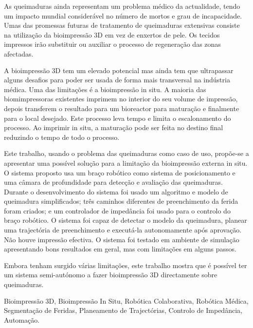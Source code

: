 
As queimaduras ainda representam um problema médico da actualidade, tendo um impacto mundial considerável no número de mortos e grau de incapacidade. Umas das promessas futuras de tratamento de queimaduras extensivas consiste na utilização da bioimpressão 3D em vez de enxertos de pele. Os tecidos impressos irão substituir ou auxiliar o processo de regeneração das zonas afectadas.

A bioimpressão 3D tem um elevado potencial mas ainda tem que ultrapassar alguns desafios para poder ser usada de forma mais transversal na indústria médica. Uma das limitações é a bioimpressão in situ. A maioria das biomimpressoras existentes imprimem no interior do seu volume de impressão, depois transferem o resultado para um bioreactor para maturação e finalmente para o local desejado. Este processo leva tempo e limita o escalonamento do processo. Ao imprimir in situ, a maturação pode ser feita no destino final reduzindo o tempo de todo o processo.

Este trabalho, usando o problema das queimaduras como caso de uso, propõe-se a apresentar uma possível solução para a limitação da bioimpressão externa in situ. O sistema proposto usa um braço robótico como sistema de posicionamento e uma câmara de profundidade para detecção e avaliação das queimaduras. Durante o desenvolvimento do sistema foi usado um algoritmo e modelo de queimadura simplificados; três caminhos diferentes de preenchimento da ferida foram criados; e um controlador de impedância foi usado para o controlo do braço robótico. O sistema foi capaz de detectar o modelo da queimadura, planear uma trajectória de preenchimento e executá-la autonomamente após aprovação. Não houve impressão efectiva. O sistema foi testado em ambiente de simulação apresentando bons resultados em geral, mas com limitações em alguns passos.

Embora tenham surgido várias limitações, este trabalho mostra que é possível ter um sistema semi-autónomo a fazer bioimpressão 3D directamente sobre queimaduras.


\begin{keywords}
Bioimpressão 3D, Bioimpressão In Situ, Robótica Colaborativa, Robótica Médica, Segmentação de Feridas, Planeamento de Trajectórias, Controlo de Impedância, Automação.
\end{keywords}
